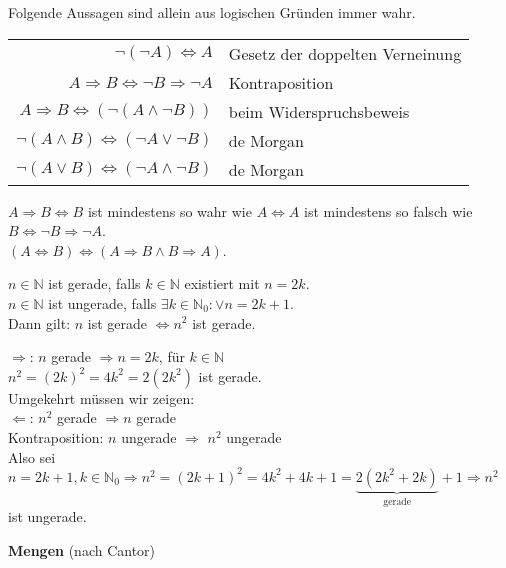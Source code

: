 \documentclass[../ana1.tex]{subfiles}
\begin{document}
\begin{satz}
	Folgende Aussagen sind allein aus logischen Gründen immer wahr.
	\begin{tabular}{rl}
		\(\neg(\neg A) \Leftrightarrow A\)                            & Gesetz der doppelten Verneinung \\
		\(A \Rightarrow B \Leftrightarrow \neg B \Rightarrow \neg A\) & Kontraposition                  \\
		\(A \Rightarrow B \Leftrightarrow (\neg (A \wedge \neg B))\)  & beim Widerspruchsbeweis         \\
		\(\neg(A \wedge B) \Leftrightarrow (\neg A \vee \neg B)\)     & de Morgan                       \\
		\(\neg(A \vee B) \Leftrightarrow (\neg A \wedge \neg B)\)     & de Morgan                       \\
	\end{tabular}
\end{satz}
\begin{bem}
	\(A\Rightarrow B\Leftrightarrow B\) ist mindestens so wahr wie \(A \Leftrightarrow A\) ist mindestens so falsch wie \(B \Leftrightarrow \neg B \Rightarrow \neg A\).\\
	\((A\Leftrightarrow B) \Leftrightarrow (A \Rightarrow B \wedge B \Rightarrow A)\).
\end{bem}
\begin{bsp}
	\(n \in \mathbb{N}\) ist gerade, falls \(k \in \mathbb{N}\) existiert mit \(n = 2k\).\\
	\(n\in \mathbb{N}\) ist ungerade, falls \(\exists k\in \mathbb{N}_0: \vee n = 2k+1\).\\
	Dann gilt: $n$ ist gerade $\Leftrightarrow n^2$ ist gerade.
	\begin{bew}
		\glqq $\Rightarrow$\grqq : $n$ gerade $\Rightarrow n=2k$, für $k\in \mathbb{N}$\\
		$n^2 = (2k)^2 = 4k^2 = 2(2k^2)$ ist gerade.\\
		Umgekehrt müssen wir zeigen:\\
		\glqq $\Leftarrow$\grqq : $n^2$ gerade $\Rightarrow n$ gerade\\
		Kontraposition: $n$ ungerade $\Rightarrow$ $n^2$ ungerade\\
		Also sei $n = 2k+1, k \in \mathbb{N}_0 \Rightarrow n^2 = (2k+1)^2 = 4k^2 + 4k + 1 = \underbrace{2(2k^2 + 2k)}_{\text{gerade}} + 1 \Rightarrow n^2$ ist ungerade.
	\end{bew}
\end{bsp}
\textbf{Mengen} (nach Cantor)\\
\end{document}
